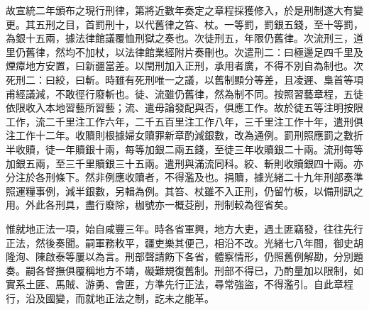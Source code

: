 \begin{pinyinscope}
故宣統二年頒布之現行刑律，第將近數年奏定之章程採獲修入，於是刑制遂大有變更。其五刑之目，首罰刑十，以代舊律之笞、杖。一等罰，罰銀五錢，至十等罰，為銀十五兩，據法律館議覆恤刑獄之奏也。次徒刑五，年限仍舊律。次流刑三，道里仍舊律，然均不加杖，以法律館業經附片奏刪也。次遣刑二：曰極邊足四千里及煙瘴地方安置，曰新疆當差。以閏刑加入正刑，承用者廣，不得不別自為制也。次死刑二：曰絞，曰斬。時雖有死刑唯一之議，以舊制顯分等差，且凌遲、梟首等項甫經議減，不敢徑行廢斬也。徒、流雖仍舊律，然為制不同。按照習藝章程，五徒依限收入本地習藝所習藝；流、遣毋論發配與否，俱應工作。故於徒五等注明按限工作，流二千里注工作六年，二千五百里注工作八年，三千里注工作十年，遣刑俱注工作十二年。收贖則根據婦女贖罪新章酌減銀數，改為通例。罰刑照應罰之數折半收贖，徒一年贖銀十兩，每等加銀二兩五錢，至徒三年收贖銀二十兩。流刑每等加銀五兩，至三千里贖銀三十五兩。遣刑與滿流同科。絞、斬則收贖銀四十兩。亦分注於各刑條下。然非例應收贖者，不得濫及也。捐贖，據光緒二十九年刑部奏準照運糧事例，減半銀數，另輯為例。其笞、杖雖不入正刑，仍留竹板，以備刑訊之用。外此各刑具，盡行廢除，枷號亦一概芟削，刑制較為徑省矣。

惟就地正法一項，始自咸豐三年。時各省軍興，地方大吏，遇土匪竊發，往往先行正法，然後奏聞。嗣軍務敉平，疆吏樂其便己，相沿不改。光緒七八年間，御史胡隆洵、陳啟泰等屢以為言。刑部聲請飭下各省，體察情形，仍照舊例解勘，分別題奏。嗣各督撫俱覆稱地方不靖，礙難規復舊制。刑部不得已，乃酌量加以限制，如實系土匪、馬賊、游勇、會匪，方準先行正法，尋常強盜，不得濫引。自此章程行，沿及國變，而就地正法之制，訖未之能革。


\end{pinyinscope}